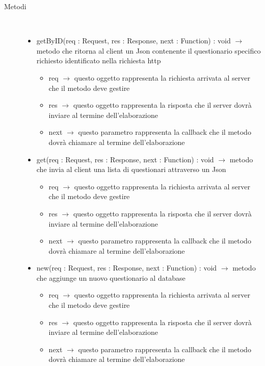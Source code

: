 \begin{description}
\item[Metodi] \hfill \\
\vspace{-7mm}
\begin{itemize}
	\item getByID(req : Request, res : Response, next : Function) : void $\rightarrow$ metodo che ritorna al client un Json contenente il questionario specifico richiesto identificato nella richiesta http\begin{itemize}
		\item req $\rightarrow$ questo oggetto rappresenta la richiesta arrivata al server che il metodo deve gestire
		\item res $\rightarrow$ questo oggetto rappresenta la risposta che il server dovrà inviare al termine dell'elaborazione
		\item next $\rightarrow$ questo parametro rappresenta la callback che il metodo dovrà chiamare al termine dell’elaborazione
	\end{itemize}
	
	\item get(req : Request, res : Response, next : Function) : void $\rightarrow$ metodo che invia al client una lista di questionari attraverso un Json\begin{itemize}
		\item req $\rightarrow$ questo oggetto rappresenta la richiesta arrivata al server che il metodo deve gestire
		\item res $\rightarrow$ questo oggetto rappresenta la risposta che il server dovrà inviare al termine dell'elaborazione
		\item next $\rightarrow$ questo parametro rappresenta la callback che il metodo dovrà chiamare al termine dell’elaborazione
	\end{itemize}
	
	\item new(req : Request, res : Response, next : Function) : void $\rightarrow$ metodo che aggiunge un nuovo questionario al database\begin{itemize}
		\item req $\rightarrow$ questo oggetto rappresenta la richiesta arrivata al server che il metodo deve gestire
		\item res $\rightarrow$ questo oggetto rappresenta la risposta che il server dovrà inviare al termine dell'elaborazione
		\item next $\rightarrow$ questo parametro rappresenta la callback che il metodo dovrà chiamare al termine dell’elaborazione
	\end{itemize}
	

\end{itemize}
\end{description}
